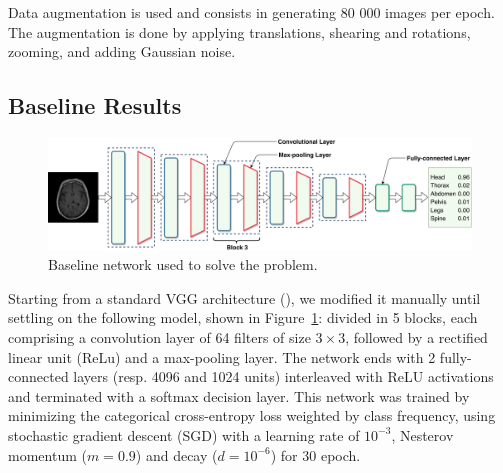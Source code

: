 Data augmentation is used and consists in generating 80 000 images per epoch. The augmentation is done by applying translations, shearing and rotations, zooming, and adding Gaussian noise.

\subsection{Baseline Results}

\begin{figure}[htb]
	\centering
	\includegraphics[width=\linewidth]{img_hyperopt/baseline.pdf}
	\caption{Baseline network used to solve the problem.}
	\label{fig:baseline}
\end{figure}

Starting from a standard VGG architecture (\textcite{simonyan2014}), we modified it manually until settling on the following model, shown in Figure~\ref{fig:baseline}: divided in 5 blocks, each comprising a convolution layer of 64 filters of size $3\times 3$, followed by a rectified linear unit (ReLu) and a max-pooling layer. The network ends with 2 fully-connected layers (resp. 4096 and 1024 units) interleaved with ReLU activations and terminated with a softmax decision layer. This network was trained by minimizing the categorical cross-entropy loss weighted by class frequency, using stochastic gradient descent (SGD) with a learning rate of $10^{-3}$, Nesterov momentum ($m = 0.9$) and decay ($d = 10^{-6}$) for 30 epoch.

